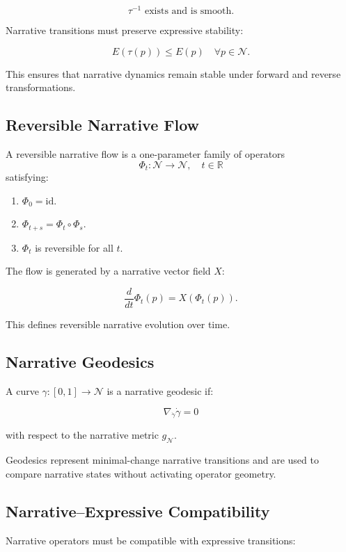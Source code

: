 \[
\tau^{-1} \text{ exists and is smooth}.
\]

Narrative transitions must preserve expressive stability:

\[
E(\tau(p)) \le E(p) \quad \forall p \in \mathcal{N}.
\]

This ensures that narrative dynamics remain stable under forward and reverse
transformations.

\subsection{Reversible Narrative Flow}

A reversible narrative flow is a one-parameter family of operators
\[
\Phi_t : \mathcal{N} \rightarrow \mathcal{N}, \quad t \in \mathbb{R}
\]
satisfying:

\begin{enumerate}
    \item $\Phi_0 = \text{id}$.
    \item $\Phi_{t+s} = \Phi_t \circ \Phi_s$.
    \item $\Phi_t$ is reversible for all $t$.
\end{enumerate}

The flow is generated by a narrative vector field $X$:

\[
\frac{d}{dt} \Phi_t(p) = X(\Phi_t(p)).
\]

This defines reversible narrative evolution over time.

\subsection{Narrative Geodesics}

A curve $\gamma : [0,1] \rightarrow \mathcal{N}$ is a narrative geodesic if:

\[
\nabla_{\dot{\gamma}} \dot{\gamma} = 0
\]

with respect to the narrative metric $g_{\mathcal{N}}$.

Geodesics represent minimal-change narrative transitions and are used to compare
narrative states without activating operator geometry.

\subsection{Narrative–Expressive Compatibility}

Narrative operators must be compatible with expressive transitions:

